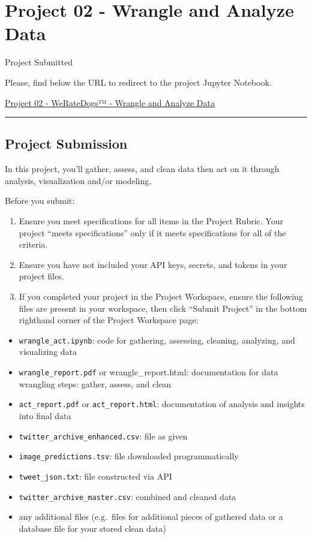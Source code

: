 \documentclass[]{book}
\providecommand{\tightlist}{%
  \setlength{\itemsep}{0pt}\setlength{\parskip}{0pt}}
\begin{document}
\section{Project 02 - Wrangle and Analyze
Data}\label{project-02---wrangle-and-analyze-data}

Project Submitted

Please, find below the URL to redirect to the project Jupyter Notebook.

\href{https://github.com/AndersonUyekita/ND111_data_science_foundations_02/blob/master/03-Chapter03/00-Project_02/wrangle_act.ipynb}{Project
02 - WeRateDogs™ - Wrangle and Analyze Data}

\begin{center}\rule{0.5\linewidth}{\linethickness}\end{center}

\subsection{Project Submission}\label{project-submission-1}

In this project, you'll gather, assess, and clean data then act on it
through analysis, visualization and/or modeling.

Before you submit:

\begin{enumerate}
\def\labelenumi{\arabic{enumi}.}
\item
  Ensure you meet specifications for all items in the Project Rubric.
  Your project ``meets specifications'' only if it meets specifications
  for all of the criteria.
\item
  Ensure you have not included your API keys, secrets, and tokens in
  your project files.
\item
  If you completed your project in the Project Workspace, ensure the
  following files are present in your workspace, then click ``Submit
  Project'' in the bottom righthand corner of the Project Workspace
  page:
\end{enumerate}

\begin{itemize}
\tightlist
\item
  \texttt{wrangle\_act.ipynb}: code for gathering, assessing, cleaning,
  analyzing, and visualizing data
\item
  \texttt{wrangle\_report.pdf} or wrangle\_report.html: documentation
  for data wrangling steps: gather, assess, and clean
\item
  \texttt{act\_report.pdf} or \texttt{act\_report.html}: documentation
  of analysis and insights into final data
\item
  \texttt{twitter\_archive\_enhanced.csv}: file as given
\item
  \texttt{image\_predictions.tsv}: file downloaded programmatically
\item
  \texttt{tweet\_json.txt}: file constructed via API
\item
  \texttt{twitter\_archive\_master.csv}: combined and cleaned data
\item
  any additional files (e.g.~files for additional pieces of gathered
  data or a database file for your stored clean data)
\end{itemize}
\end{document}
